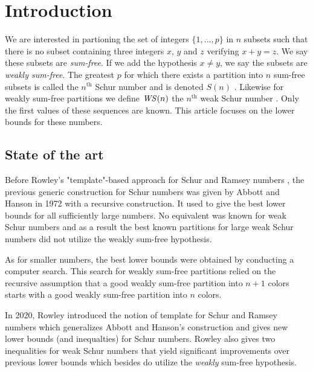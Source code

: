 \section{Introduction}

\qquad We are interested in partioning the set of integers \(\{1, ..., p\}\) in \(n\) subsets such that there is no 
subset containing three integers \(x\), \(y\) and \(z\) verifying \(x + y = z\). We say these subsets are 
\textit{sum-free}. If we add the hypothesis \(x \neq y\), we say the subsets are \textit{weakly sum-free}. The 
greatest \(p\) for which there exists a partition into \(n\) sum-free subsets is called the \(n^{\text{th}}\) Schur 
number and is denoted \(S(n)\) \cite{Schur1917}. Likewise for weakly sum-free partitions we define \(\mathit{WS}(n)\) 
the \(n^{\text{th}}\) weak Schur number \cite{Irving1973}. Only the first values of these sequences are known. 
This article focuses on the lower bounds for these numbers.


\subsection{State of the art}

\qquad Before Rowley's "template"-based approach for Schur and Ramsey numbers \cite{RowleyRamsey}, the 
previous generic construction for Schur numbers was given by Abbott and Hanson \cite{AbbottHanson} in 1972 
with a recursive construction. It used to give the best lower bounds for all sufficiently large numbers. No equivalent 
was known for weak Schur numbers and as a result the best known partitions for large weak Schur numbers 
did not utilize the weakly sum-free hypothesis. 

\par
As for smaller numbers, the best lower bounds were obtained by conducting a computer search. This search for 
weakly sum-free partitions relied on the recursive assumption that a good weakly sum-free partition into \(n+1\) 
colors starts with a good weakly sum-free partition into \(n\) colors. 

\par
In 2020, Rowley introduced the notion of template for Schur and Ramsey numbers which generalizes Abbott and 
Hanson's construction and gives new lower bounds (and inequalties) for Schur numbers. Rowley also gives two 
inequalities for weak Schur numbers \cite{RowleyWS} that yield significant improvements over previous lower 
bounds which besides do utilize the \textit{weakly} sum-free hypothesis.

